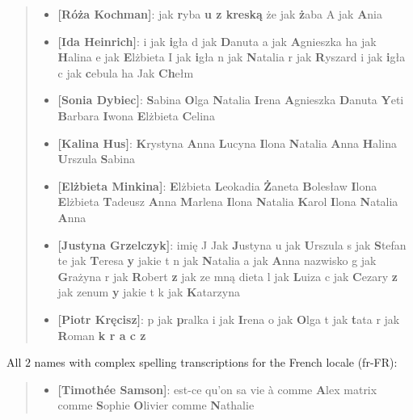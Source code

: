 \documentclass[11pt]{article}
\begin{document}
{\begin{quote}
{\begin{itemize}[align=left,leftmargin=5pt,rightmargin=-10pt]
\item \textbf{[Róża Kochman]}: jak \textbf{r}yba \textbf{u z kreską} że jak \textbf{ż}aba A jak \textbf{A}nia

\item \textbf{[Ida Heinrich]}: i jak \textbf{i}gła d jak \textbf{D}anuta a jak \textbf{A}gnieszka ha jak \textbf{H}alina e jak \textbf{E}lżbieta I jak \textbf{i}gła n jak \textbf{N}atalia r jak \textbf{R}yszard i jak \textbf{i}gła c jak \textbf{c}ebula ha Jak \textbf{Ch}ełm

\item \textbf{[Sonia Dybiec]}: \textbf{S}abina \textbf{O}lga \textbf{N}atalia \textbf{I}rena \textbf{A}gnieszka \textbf{D}anuta \textbf{Y}eti \textbf{B}arbara \textbf{I}wona \textbf{E}lżbieta \textbf{C}elina

\item \textbf{[Kalina Hus]}: \textbf{K}rystyna \textbf{A}nna \textbf{L}ucyna \textbf{I}lona \textbf{N}atalia \textbf{A}nna \textbf{H}alina \textbf{U}rszula \textbf{S}abina

\item \textbf{[Elżbieta Minkina]}: \textbf{E}lżbieta \textbf{L}eokadia \textbf{Ż}aneta \textbf{B}olesław \textbf{I}lona \textbf{E}lżbieta \textbf{T}adeusz \textbf{A}nna \textbf{M}arlena \textbf{I}lona \textbf{N}atalia \textbf{K}arol \textbf{I}lona \textbf{N}atalia \textbf{A}nna

\item \textbf{[Justyna Grzelczyk]}: imię J Jak \textbf{J}ustyna u jak \textbf{U}rszula s jak \textbf{S}tefan te jak \textbf{T}eresa \textbf{y} jakie t n jak \textbf{N}atalia a jak \textbf{A}nna nazwisko g jak \textbf{G}rażyna r jak \textbf{R}obert \textbf{z} jak ze mną dieta l jak \textbf{L}uiza c jak \textbf{C}ezary \textbf{z} jak zenum \textbf{y} jakie t k jak \textbf{K}atarzyna

\item \textbf{[Piotr Kręcisz]}: p jak \textbf{p}ralka i jak \textbf{I}rena o jak \textbf{O}lga t jak \textbf{t}ata r jak \textbf{R}oman \textbf{k r a c z}

\end{itemize}}
\end{quote}
All $2$ names with complex spelling transcriptions for the French locale (fr-FR):
\begin{quote}
{\small
\begin{itemize}[align=left,leftmargin=5pt,rightmargin=-10pt]
\item \textbf{[Timothée Samson]}: est-ce qu'on sa vie à comme \textbf{A}lex matrix comme \textbf{S}ophie \textbf{O}livier comme \textbf{N}athalie


\end{itemize}}
\end{quote}}
\end{document}
